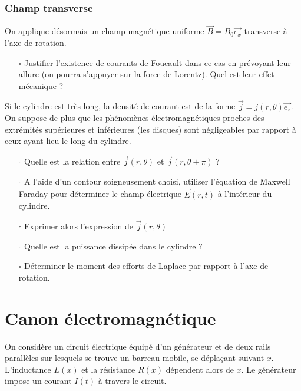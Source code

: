 \documentclass{report}
\begin{document}
	
\subsubsection*{Champ transverse}	
	
	On applique désormais un champ magnétique uniforme $\vec{B}=B_{0}\vec{e_{x}}$ transverse à l'axe de rotation.
	
\begin{itemize}
	
		\item[$\square$] Justifier l'existence de courants de Foucault dans ce cas en prévoyant leur allure (on pourra s'appuyer sur la force de Lorentz). Quel est leur effet mécanique ?

\end{itemize}
		
Si le cylindre est très long, la densité de courant est de la forme $\vec{j}=j(r,\theta)\vec{e_{z}}$. On suppose de plus que les phénomènes électromagnétiques proches des extrémités supérieures et inférieures (les disques) sont négligeables par rapport à ceux ayant lieu le long du cylindre.

\begin{itemize}

		\item[$\square$] Quelle est la relation entre $\vec{j}(r,\theta)$ et $\vec{j}(r,\theta+\pi)$ ?
		
		\item[$\square$] A l'aide d'un contour soigneusement choisi, utiliser l'équation de Maxwell Faraday pour déterminer le champ électrique $\vec{E}(r,t)$ à l'intérieur du cylindre.
		
		\item[$\square$] Exprimer alors l'expression de $\vec{j}(r,\theta)$ 
		
		\item[$\square$] Quelle est la puissance dissipée dans le cylindre ?
		
		\item[$\square$] Déterminer le moment des efforts de Laplace par rapport à l'axe de rotation.
		
\end{itemize}

\newpage

\section*{Canon électromagnétique}

On considère un circuit électrique équipé d'un générateur et de deux rails parallèles sur lesquels se trouve un barreau mobile, se déplaçant suivant $x$. L'inductance $L(x)$ et la résistance $R(x)$ dépendent alors de $x$. Le générateur impose un courant $I(t)$ à travers le circuit. 
\end{document}
